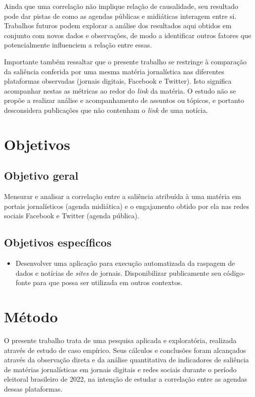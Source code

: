 \documentclass[
	12pt,
	oneside,
	a4paper,
	english,
	brazil
]{abntex2ppgsi}
\begin{document}
Ainda que uma correlação não implique relação de causalidade, seu resultado pode dar pistas de como as agendas públicas e midiáticas interagem entre si. Trabalhos futuros podem explorar a análise dos resultados aqui obtidos em conjunto com novos dados e observações, de modo a identificar outros fatores que potencialmente influenciem a relação entre essas.

Importante também ressaltar que o presente trabalho se restringe à comparação da saliência conferida por uma mesma matéria jornalística nas diferentes plataformas observadas (jornais digitais, Facebook e Twitter). Isto significa acompanhar nestas as métricas ao redor do \textit{link} da matéria. O estudo não se propõe a realizar análise e acompanhamento de assuntos ou tópicos, e portanto desconsidera publicações que não contenham o \textit{link} de uma notícia.


\section{Objetivos}
\subsection{Objetivo geral}
Mensurar e analisar a correlação entre a saliência atribuída à uma matéria em portais jornalísticos (agenda midiática) e o engajamento obtido por ela nas redes sociais Facebook e Twitter (agenda pública).

\subsection{Objetivos específicos}
\begin{itemize}
    \item Desenvolver uma aplicação para execução automatizada da raspagem de dados e notícias de \textit{sites} de jornais. Disponibilizar publicamente seu código-fonte para que possa ser utilizada em outros contextos.
\end{itemize}


\section{Método}
O presente trabalho trata de uma pesquisa aplicada e exploratória, realizada através de estudo de caso empírico. Seus cálculos e conclusões foram alcançados através da observação direta e da análise quantitativa de indicadores de saliência de matérias jornalísticas em jornais digitais e redes sociais durante o período eleitoral brasileiro de 2022, na intenção de estudar a correlação entre as agendas dessas plataformas.
\end{document}
